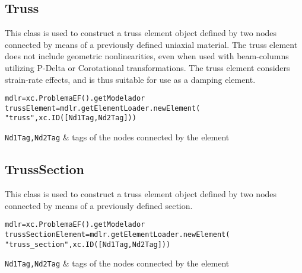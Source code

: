 \subsection{Truss}
This class is used to construct a truss element object defined by two nodes connected by means of a previously defined uniaxial material.
The truss element does not include geometric nonlinearities, even when used with beam-columns utilizing P-Delta or Corotational transformations.
The truss element considers strain-rate effects, and is thus suitable for use as a damping element. 
\begin{verbatim}
mdlr=xc.ProblemaEF().getModelador
trussElement=mdlr.getElementLoader.newElement(
"truss",xc.ID([Nd1Tag,Nd2Tag]))
\end{verbatim}
\begin{paramFuncTable}
{\tt Nd1Tag,Nd2Tag} & tags of the nodes connected by the element\\
\end{paramFuncTable}

\begin{paramClassTable}
\ElementParam{}
\ElementONEDParam{}
\end{paramClassTable}

\begin{methodsTable}
\ElementMeth{}
\ElementONEDMeth{}
\ProtoTrussMeth{}
\TrussBaseMeth{}
\TrussMeth{}
\end{methodsTable}


\subsection{TrussSection}
This class is used to construct a truss element object defined by two nodes connected by means of a previously defined section.
\begin{verbatim}
mdlr=xc.ProblemaEF().getModelador
trussSectionElement=mdlr.getElementLoader.newElement(
"truss_section",xc.ID([Nd1Tag,Nd2Tag]))
\end{verbatim}
\begin{paramFuncTable}
{\tt Nd1Tag,Nd2Tag} & tags of the nodes connected by the element\\
\end{paramFuncTable}

\begin{paramClassTable}
\ElementParam{}
\ElementONEDParam{}
\end{paramClassTable}

\begin{methodsTable}
\ElementMeth{}
\ElementONEDMeth{}
\ProtoTrussMeth{}
\TrussBaseMeth{}
\end{methodsTable}

